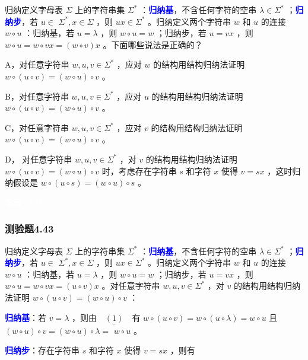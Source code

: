 \documentclass[UTF8, heading=true]{ctexart}
\begin{document}
归纳定义字母表 $\Sigma$ 上的字符串集 $\Sigma^*$ ：\textcolor{blue}{\textbf{归纳基}}，不含任何字符的空串 $\lambda \in \Sigma^*$ ；\textcolor{blue}{\textbf{归纳步}}，若 $u \in$ $\Sigma^*, x \in \Sigma$ ，则 $u x \in \Sigma^*$ 。归纳定义两个字符串 $w$ 和 $u$ 的连接 $w \circ u$ ：归纳基，若 $u=\lambda$ ，则 $w \circ u=w$ ；归纳步，若 $u=v x$ ，则 $w \circ u=w \circ v x=(w \circ v) x$ 。下面哪些说法是正确的？

A，对任意字符串 $w, u, v \in \Sigma^*$ ，应对 $w$ 的结构用结构归纳法证明 $w \circ(u \circ v)=(w \circ u) \circ v$ 。

B，对任意字符串 $w, u, v \in \Sigma^*$ ，应对 $u$ 的结构用结构归纳法证明 $w \circ(u \circ v)=(w \circ u) \circ v$ 。

C，对任意字符串 $w, u, v \in \Sigma^*$ ，应对 $v$ 的结构用结构归纳法证明 $w \circ(u \circ v)=(w \circ u) \circ v$ 。

D，
对任意字符串 $w, u, v \in \Sigma^*$ ，对 $v$ 的结构用结构归纳法证明 $w \circ(u \circ v)=(w \circ u) \circ v$ 时，考虑存在字符串 $s$ 和字符 $x$ 使得 $v=s x$ ，这时归纳假设是 $w \circ(u \circ s)=(w \circ u) \circ s$ 。


\textcolor{white}{答案：CD}

\subsubsection{测验题4.43}

归纳定义字母表 $\Sigma$ 上的字符串集 $\Sigma^*$ ：\textcolor{blue}{\textbf{归纳基}}，不含任何字符的空串 $\lambda \in \Sigma^*$ ；\textcolor{blue}{\textbf{归纳步}}，若 $u \in$ $\Sigma^*, x \in \Sigma$ ，则 $u x \in \Sigma^*$ 。归纳定义两个字符串 $w$ 和 $u$ 的连接 $w \circ u$ ：归纳基，若 $u=\lambda$ ，则 $w \circ u=w$ ；归纳步，若 $u=v x$ ，则 $w \circ u=w \circ v x=(u \circ v) x$ 。对任意字符串 $w, u, v \in \Sigma^*$ ，对 $v$ 的结构用结构归纳法证明 $w \circ(u \circ v)=(w \circ u) \circ v$ ：

\textcolor{blue}{\textbf{归纳基}}：若 $v=\lambda$ ，则由$\underline{\quad(1)\quad}$有 $w \circ(u \circ v)=w \circ(u \circ \lambda)=w \circ u$ 且 $(w \circ u) \circ v=(w \circ u) \circ \lambda=$ $w \circ u$ 。

\textcolor{blue}{\textbf{归纳步}}：存在字符串 $s$ 和字符 $x$ 使得 $v=s x$ ，则有
\end{document}

